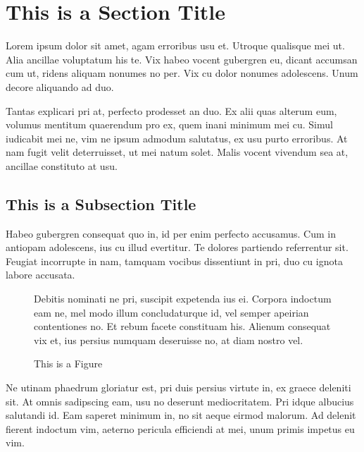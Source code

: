 
\section{This is a Section Title}

Lorem ipsum dolor sit amet, agam erroribus usu et. Utroque qualisque mei ut.
Alia ancillae voluptatum his te. Vix habeo vocent gubergren eu, dicant accumsan
cum ut, ridens aliquam nonumes no per. Vix cu dolor nonumes adolescens. Unum
decore aliquando ad duo.

Tantas explicari pri at, perfecto prodesset an duo. Ex alii quas alterum eum,
volumus mentitum quaerendum pro ex, quem inani minimum mei cu. Simul iudicabit
mei ne, vim ne ipsum admodum salutatus, ex usu purto erroribus. At nam fugit
velit deterruisset, ut mei natum solet. Malis vocent vivendum sea at, ancillae
constituto at usu.

\subsection{This is a Subsection Title}

Habeo gubergren consequat quo in, id per enim perfecto accusamus. Cum in
antiopam adolescens, ius cu illud evertitur. Te dolores partiendo referrentur
sit. Feugiat incorrupte in nam, tamquam vocibus dissentiunt in pri, duo cu
ignota labore accusata.

\begin{figure}[h]

	\centering

	\begin{minipage}{0.75\linewidth}

	Debitis nominati ne pri, suscipit expetenda ius ei. Corpora indoctum
	eam ne, mel modo illum concludaturque id, vel semper apeirian
	contentiones no. Et rebum facete constituam his. Alienum consequat vix
	et, ius persius numquam deseruisse no, at diam nostro vel.

	\end{minipage}

	\caption{This is a Figure}

\end{figure}

Ne utinam phaedrum gloriatur est, pri duis persius virtute in, ex graece
deleniti sit. At omnis sadipscing eam, usu no deserunt mediocritatem. Pri idque
albucius salutandi id. Eam saperet minimum in, no sit aeque eirmod malorum. Ad
delenit fierent indoctum vim, aeterno pericula efficiendi at mei, unum primis
impetus eu vim.

